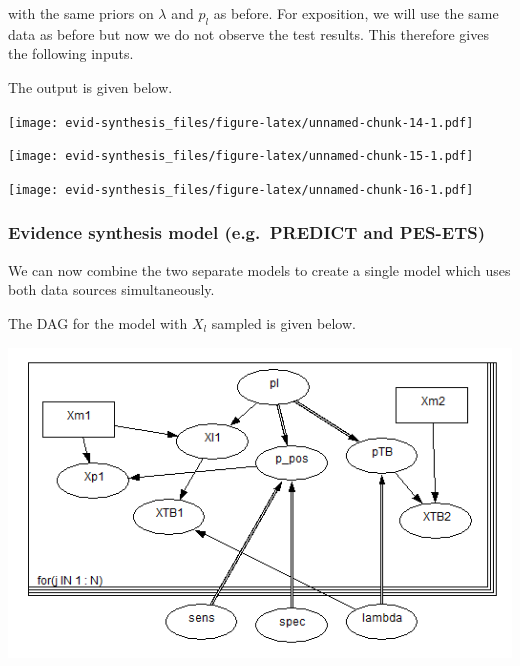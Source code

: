 \documentclass[]{article}
\newenvironment{Shaded}{\begin{snugshade}}{\end{snugshade}}
\newcommand{\DataTypeTok}[1]{\textcolor[rgb]{0.13,0.29,0.53}{#1}}
\newcommand{\KeywordTok}[1]{\textcolor[rgb]{0.13,0.29,0.53}{\textbf{#1}}}
\newcommand{\NormalTok}[1]{#1}
\newcommand{\OperatorTok}[1]{\textcolor[rgb]{0.81,0.36,0.00}{\textbf{#1}}}
\newcommand{\StringTok}[1]{\textcolor[rgb]{0.31,0.60,0.02}{#1}}
\begin{document}
with the same priors on \(\lambda\) and \(p_l\) as before. For
exposition, we will use the same data as before but now we do not
observe the test results. This therefore gives the following inputs.

\begin{Shaded}
\end{Shaded}

The output is given below.

\texttt{[image: evid-synthesis\_files/figure-latex/unnamed-chunk-14-1.pdf]}

\texttt{[image: evid-synthesis\_files/figure-latex/unnamed-chunk-15-1.pdf]}

\texttt{[image: evid-synthesis\_files/figure-latex/unnamed-chunk-16-1.pdf]}

\hypertarget{evidence-synthesis-model-e.g.-predict-and-pes-ets}{%
\subsubsection{Evidence synthesis model (e.g.~PREDICT and
PES-ETS)}\label{evidence-synthesis-model-e.g.-predict-and-pes-ets}}

We can now combine the two separate models to create a single model
which uses both data sources simultaneously.

The DAG for the model with \(X_l\) sampled is given below.

\includegraphics{DAG-full_model.PNG}
\end{document}
